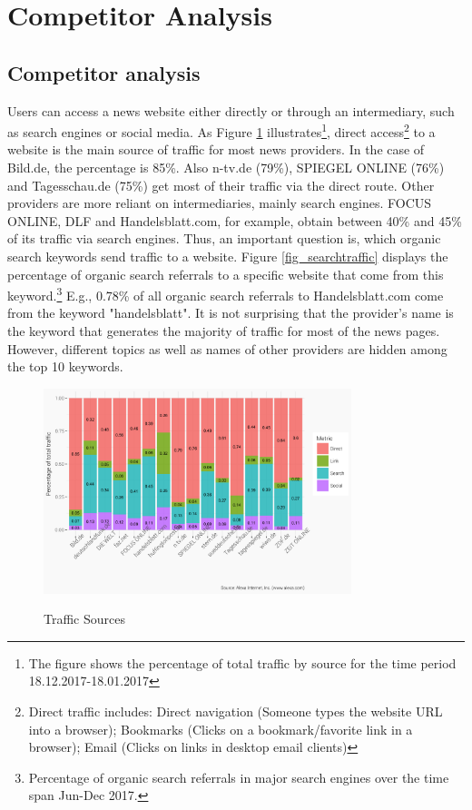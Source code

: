 \documentclass[12pt,a4paper,notitlepage]{article}
\begin{document}
\section{Competitor Analysis}
\subsection{Competitor analysis}



Users can access a news website either directly or through an intermediary, such as search engines or social media.  As Figure \ref{fig_traffic} illustrates\footnote{The figure shows the percentage of total traffic by source for the time period 18.12.2017-18.01.2017}, direct access\footnote{Direct traffic includes: Direct navigation (Someone types the website URL into a browser); Bookmarks (Clicks on a bookmark/favorite link in a browser); Email (Clicks on links in desktop email clients)} to a website is the main source of traffic for most news providers. In the case of Bild.de, the percentage is 85\%. Also n-tv.de (79\%), SPIEGEL ONLINE (76\%) and Tagesschau.de (75\%) get most of their traffic via the direct route. Other providers are more reliant on intermediaries, mainly search engines. FOCUS ONLINE, DLF and Handelsblatt.com, for example, obtain between 40\% and 45\% of its traffic via search engines. Thus, an important question is, which organic search keywords send traffic to a website. Figure \ref{fig_searchtraffic} displays the percentage of organic search referrals to a specific website that come from this keyword.\footnote{Percentage of organic search referrals in major search engines over the time span Jun-Dec 2017.} E.g., 0.78\% of all organic search referrals to Handelsblatt.com come from the keyword "handelsblatt". It is not surprising that the provider's name is the keyword that generates the majority of traffic for most of the news pages. However, different topics as well as names of other providers are hidden among the top 10 keywords.   

\begin{figure}[H]
	\caption{Traffic Sources}
	\begin{center}
		\includegraphics[width=0.8\textwidth]{../figs/traffic_source.png}
		\label{fig_traffic}
	\end{center}
\end{figure}
\end{document}

